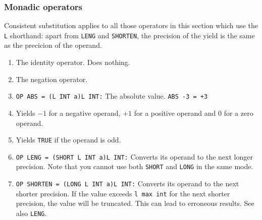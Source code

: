 \subsubsection*{Monadic operators}
Consistent substitution applies to all those operators in this section
which use the \verb|L| shorthand: apart from \verb|LENG| and
\verb|SHORTEN|, the precision of the yield is the same as the precicion
of the operand.
\begin{enumerate}
\item {}\newline
The identity operator. Does nothing.
\item {}\newline
The negation operator.
\item \verb|OP ABS = (L INT a)L INT:|\newline
The absolute value. \verb|ABS -3 = +3|
\item {}\newline
Yields $-1$ for a negative operand, $+1$ for a positive operand and $0$
for a zero operand.
\item {} \newline
Yields \verb|TRUE| if the operand is odd.
\item {} \newline
\verb|OP LENG = (SHORT L INT a)L INT:| \newline
Converts its operand to the next longer precision. Note that you cannot
use both \verb|SHORT| and \verb|LONG| in the same mode.
\item {}
\newline
\verb|OP SHORTEN = (LONG L INT a)L INT:| \newline
Converts its operand to the next shorter precision. If the value
exceeds \verb|l max int| for the next shorter precision, the value will
be truncated. This can lead to erroneous results. See also \verb|LENG|.
\end{enumerate}

